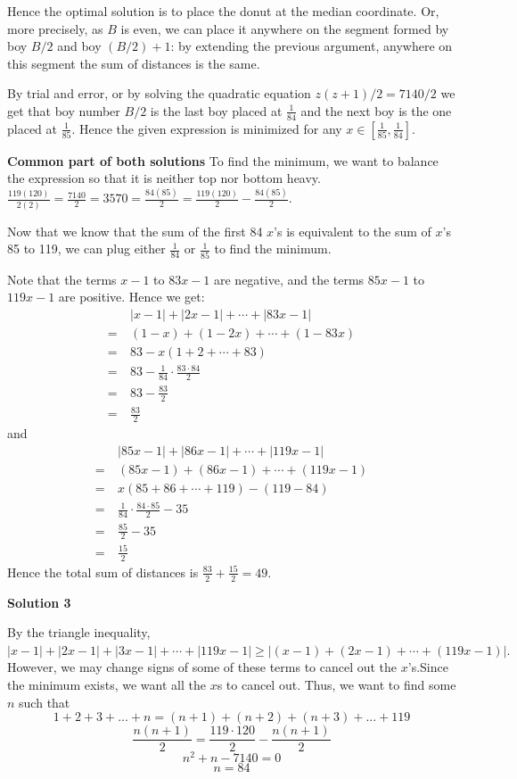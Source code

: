 \begin{enumerate}
 Hence the optimal solution is to place the donut at the median coordinate. Or, more precisely, as $B$ is even, we can place it anywhere on the segment formed by boy $B/2$ and boy $(B/2)+1$: by extending the previous argument, anywhere on this segment the sum of distances is the same.

 By trial and error, or by solving the quadratic equation $z(z+1)/2 = 7140/2$ we get that boy number $B/2$ is the last boy placed at $\frac 1{84}$ and the next boy is the one placed at $\frac 1{85}$. Hence the given expression is minimized for any $x\in\left[ \frac 1{85}, \frac 1{84} \right]$.

 \textbf{Common part of both solutions} To find the minimum, we want to balance the expression so that it is neither top nor bottom heavy. $\frac{119(120)}{2(2)}=\frac{7140}{2}=3570=\frac{84(85)}{2}=\frac{119(120)}{2}-\frac{84(85)}{2}$.

 Now that we know that the sum of the first 84 $x$'s is equivalent to the sum of $x$'s 85 to 119, we can plug either $\frac{1}{84}$ or $\frac{1}{85}$ to find the minimum.

 Note that the terms $x-1$ to $83x-1$ are negative, and the terms $85x-1$ to $119x-1$ are positive. Hence we get:
 \begin{align*} & |x-1| + |2x-1| + \cdots + |83x-1| \\ =~ & (1-x) + (1-2x) + \cdots + (1-83x) \\ =~ & 83 - x(1+2+\cdots+83) \\ =~ & 83 - \frac 1{84} \cdot \frac{83\cdot 84}2 \\ =~ & 83 - \frac{83}2 \\ =~ & \frac{83}2 \end{align*}
and
 \begin{align*} & |85x-1| + |86x-1| + \cdots + |119x-1| \\ =~ & (85x-1) + (86x-1) + \cdots + (119x-1) \\ =~ & x(85+86+\cdots+119) - (119-84) \\ =~ & \frac 1{84} \cdot \frac{84\cdot 85}2 - 35 \\ =~ & \frac{85}2 - 35 \\ =~ & \frac{15}2 \end{align*}
Hence the total sum of distances is $\frac{83}2 + \frac{15}2 = 49$.

 



\textbf{Solution 3}

By the triangle inequality,$|x-1|+|2x-1|+|3x-1|+\cdots + |119x-1| \geq |(x-1)+(2x-1)+\cdots+(119x-1)|.$However, we may change signs of some of these terms to cancel out the $x$'s.Since the minimum exists, we want all the $x$s to cancel out. Thus, we want to find some $n$ such that 
 \[1+2+3+...+n=(n+1)+(n+2)+(n+3)+...+119\] 
 \[\frac{n(n+1)}{2}=\frac{119\cdot120}{2}-\frac{n(n+1)}{2}\] 
 \[n^2+n-7140=0\] 
 \[n=84\]


\end{enumerate}
